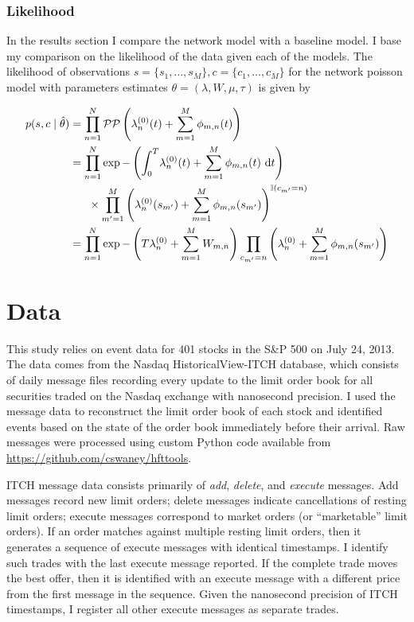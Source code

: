 		\subsubsection*{Likelihood}
			In the results section I compare the network model with a baseline model. I base my comparison on the likelihood of the data given each of the models. The likelihood of observations $s = \{s_1, \dots, s_M\}, c=\{c_1, \dots, c_M\}$ for the network poisson model with parameters estimates $\theta = (\lambda, W, \mu, \tau)$ is given by

			\begin{align}
			\label{eqn:likelihood}
				p(s, c \mid \hat{\theta}) &= \prod_{n=1}^{N} \mathcal{PP} \left( \lambda_n^{(0)}(t) + \sum_{m=1}^{M} \phi_{m , n}(t) \right) \notag \\
				&= \prod_{n=1}^N \exp -\left( \int_{0}^{T} \! \lambda_n^{(0)}(t) + \sum_{m=1}^{M} \phi_{m , n}(t) \ \mathrm{d}t \right) \notag \\
				& \ \ \ \ \ \times \prod_{m'=1}^M \left( \lambda_n^{(0)}(s_{m'}) + \sum_{m=1}^{M} \phi_{m , n}(s_{m'}) \right)^{\mathbb{I} (c_{m'} = n)} \notag \\
				&= \prod_{n=1}^N \exp -\left(T \lambda_n^{(0)} + \sum_{m=1}^M W_{m,n} \right) \prod_{c_{m'}=n} \left( \lambda_n^{(0)} + \sum_{m=1}^{M} \phi_{m , n}(s_{m'}) \right)
			\end{align}

			\vspace{5mm}


\section{Data}
	This study relies on event data for 401 stocks in the S\&P 500 on July 24, 2013. The data comes from the Nasdaq HistoricalView-ITCH database, which consists of daily message files recording every update to the limit order book for all securities traded on the Nasdaq exchange with nanosecond precision. I used the message data to reconstruct the limit order book of each stock and identified events based on the state of the order book immediately before their arrival. Raw messages were processed using custom Python code available from \url{https://github.com/cswaney/hfttools}.

	ITCH message data consists primarily of \textit{add}, \textit{delete}, and \textit{execute} messages. Add messages record new limit orders; delete messages indicate cancellations of resting limit orders; execute messages correspond to market orders (or ``marketable'' limit orders). If an order matches against multiple resting limit orders, then it generates a sequence of execute messages with identical timestamps. I identify such trades with the last execute message reported. If the complete trade moves the best offer, then it is identified with an execute message with a different price from the first message in the sequence. Given the nanosecond precision of ITCH timestamps, I register all other execute messages as separate trades.

